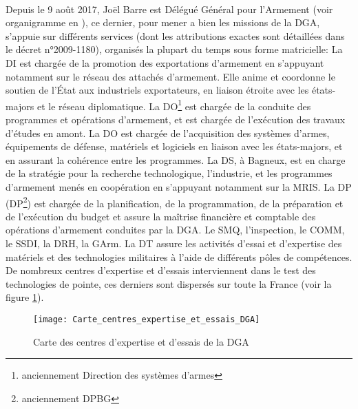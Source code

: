\documentclass[11pt, book, english, french, standardlists]{upmethodology-document}
\begin{document}
				\paragraph*{}
					Depuis le 9 août 2017, Joël Barre est Délégué Général pour l'Armement (voir organigramme en ), ce dernier, pour mener a bien les missions de la \gls{DGA}, s'appuie sur différents services (dont les attributions exactes sont détaillées dans le décret n°2009-1180\cite{DEFD0918712D}), organisés la plupart du temps sous forme matricielle:
					La \gls{DI} est chargée de la promotion des exportations d’armement en s’appuyant notamment sur le réseau des attachés d’armement. Elle anime et coordonne le soutien de l'État aux industriels exportateurs, en liaison étroite avec les états-majors et le réseau diplomatique.
					La \gls{DO}\footnote{anciennement Direction des systèmes d'armes} est chargée de la conduite des programmes et opérations d'armement, et est chargée de l’exécution des travaux d'études en amont. La \gls{DO} est chargée de l'acquisition des systèmes d'armes, équipements de défense, matériels et logiciels en liaison avec les états-majors, et en assurant la cohérence entre les programmes.
					La \gls{DS}, à Bagneux, est en charge de la stratégie pour la recherche technologique, l’industrie, et les programmes d’armement menés en coopération en s'appuyant notamment sur la \gls{MRIS}.
					La \acrlong{DP} (\acrshort{DP}\footnote{anciennement DPBG}) est chargée de la planification, de la programmation, de la préparation et de l'exécution du budget et assure la maîtrise financière et comptable des opérations d'armement conduites par la \gls{DGA}.
					Le \gls{SMQ}, l’inspection, le \gls{COMM}, le \gls{SSDI}, la \gls{DRH}, la \gls{GArm}.
					La \gls{DT} assure les activités d’essai et d’expertise des matériels et des technologies militaires à l’aide de différents pôles de compétences. De nombreux centres d’expertise et d’essais interviennent dans le test des technologies de pointe, ces derniers sont dispersés sur toute la France (voir la figure \ref{fig:Carte_centres_expertise_et_essais_DGA}).
					\begin{figure}[H]
						\centering
						\texttt{[image: Carte\_centres\_expertise\_et\_essais\_DGA]}
						\caption{Carte des centres d’expertise et d’essais de la \acrshort{DGA}\cite{OptroDefDGA}}
						\label{fig:Carte_centres_expertise_et_essais_DGA}
					\end{figure}
\end{document}
